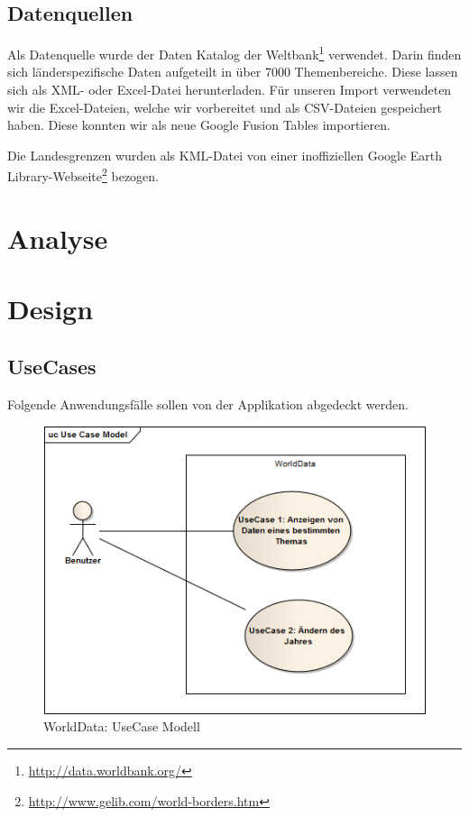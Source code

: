 \subsection{Datenquellen}
Als Datenquelle wurde der Daten Katalog der Weltbank\footnote{\url{http://data.worldbank.org/}} verwendet. Darin finden sich länderspezifische Daten aufgeteilt in über 7000 Themenbereiche. Diese lassen sich als XML- oder Excel-Datei herunterladen. Für unseren Import verwendeten wir die Excel-Dateien, welche wir vorbereitet und als CSV-Dateien gespeichert haben. Diese konnten wir als neue Google Fusion Tables importieren.

Die Landesgrenzen wurden als \gls{KML}-Datei von einer inoffiziellen Google Earth Library-Webseite\footnote{\url{http://www.gelib.com/world-borders.htm}} bezogen. 

\section{Analyse}

\section{Design}

\subsection{UseCases}
Folgende Anwendungsfälle sollen von der Applikation abgedeckt werden.

\begin{figure}[H]
	\centering
	\includegraphics[scale=0.8]{images/usecase1-worlddata/uml/worlddata-usecasemodel.png}
	\caption{WorldData: UseCase Modell}
	\label{worlddata-usecasemodel}
\end{figure}


